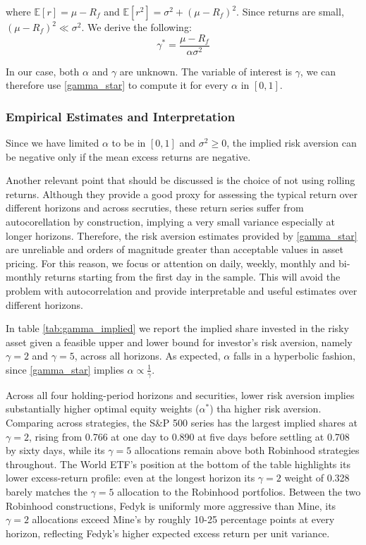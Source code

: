 where $\mathbb{E}[r]=\mu-R_f$ and $\mathbb{E}[r^2]=\sigma^2+(\mu-R_f)^2$. 
Since returns are small, $(\mu-R_f)^2\ll\sigma^2$. We derive the following:
\begin{equation}
    \gamma^* = \frac{\mu-R_f}{\alpha \sigma^2}
    \label{gamma_star}
\end{equation}

In our case, both $\alpha$ and $\gamma$ are unknown. 
The variable of interest is $\gamma$, we can therefore use \ref{gamma_star} to compute it for every $\alpha$ in $[0,1]$. 


\subsubsection{Empirical Estimates and Interpretation}
\label{sec:gamma_estimates}
Since we have limited $\alpha$ to be in $[0,1]$ and $\sigma^2 \geq 0$, the implied risk aversion can be negative only if the mean excess returns are negative.

Another relevant point that should be discussed is the choice of not using rolling returns. 
Although they provide a good proxy for assessing the typical return over different horizons and across secruties, 
these return series suffer from autocorellation by construction, implying a very small variance especially at longer horizons.
Therefore, the risk aversion estimates provided by \ref{gamma_star} are unreliable and orders of magnitude greater than acceptable values in asset pricing.
For this reason, we focus or attention on daily, weekly, monthly and bi-monthly returns starting from the first day in the sample. This will avoid the problem with autocorrelation and provide interpretable and useful estimates over different horizons.


In table \ref{tab:gamma_implied} we report the implied share invested in the risky asset given a feasible upper and lower bound for investor's risk aversion, namely $\gamma=2$ and $\gamma=5$,
across all horizons.
As expected, $\alpha$ falls in a hyperbolic fashion, since \ref{gamma_star} implies $\alpha \propto \frac{1}{\gamma}$.

Across all four holding-period horizons and securities, lower risk aversion implies substantially higher optimal equity weights ($\alpha^*$) tha higher risk aversion.
Comparing across strategies, the S\&P 500 series has the largest implied shares at $\gamma=2$, rising from 0.766 at one day to 0.890 at five days before settling at 0.708 by sixty days, while its $\gamma=5$ allocations remain above both Robinhood strategies throughout. 
The World ETF's position at the bottom of the table highlights its lower excess-return profile: even at the longest horizon its $\gamma=2$ weight of 0.328 barely matches the $\gamma=5$ allocation to the Robinhood portfolios. 
Between the two Robinhood constructions, Fedyk is uniformly more aggressive than Mine, its $\gamma=2$ allocations exceed Mine's by roughly 10-25 percentage points at every horizon, reflecting Fedyk's higher expected excess return per unit variance.